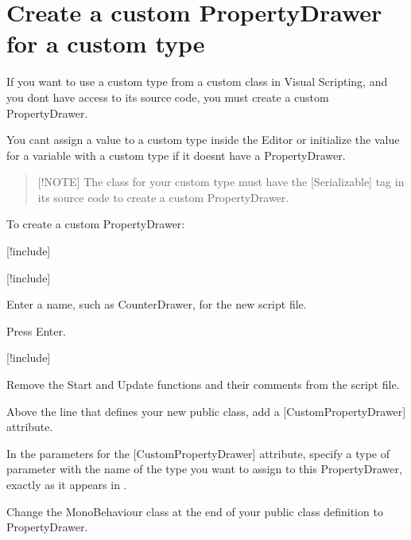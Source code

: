 \chapter{Create a custom Property\+Drawer for a custom type}
\hypertarget{md__library_2_package_cache_2com_8unity_8visualscripting_0d1_89_82_2_documentation_0i_2vs-create-custom-drawer}{}\label{md__library_2_package_cache_2com_8unity_8visualscripting_0d1_89_82_2_documentation_0i_2vs-create-custom-drawer}
\label{md__library_2_package_cache_2com_8unity_8visualscripting_0d1_89_82_2_documentation_0i_2vs-create-custom-drawer_autotoc_md1740}%
%
 If you want to use a custom type from a custom class in Visual Scripting, and you don\textquotesingle{}t have access to its source code, you must create a custom Property\+Drawer.

You can\textquotesingle{}t assign a value to a custom type inside the Editor or initialize the value for a variable with a custom type if it doesn\textquotesingle{}t have a Property\+Drawer.

\begin{quote}
\mbox{[}!\+NOTE\mbox{]} The class for your custom type must have the {\ttfamily \mbox{[}Serializable\mbox{]}} tag in its source code to create a custom Property\+Drawer. \end{quote}
To create a custom Property\+Drawer\+:


\begin{DoxyEnumerate}
\item \mbox{[}!include\mbox{]}
\item \mbox{[}!include\mbox{]}
\item Enter a name, such as {\ttfamily Counter\+Drawer}, for the new script file.
\item Press Enter.
\item \mbox{[}!include\mbox{]}
\item Remove the {\ttfamily Start} and {\ttfamily Update} functions and their comments from the script file.
\item Above the line that defines your new {\ttfamily public class}, add a {\ttfamily \mbox{[}Custom\+Property\+Drawer\mbox{]}} attribute.
\item In the parameters for the {\ttfamily \mbox{[}Custom\+Property\+Drawer\mbox{]}} attribute, specify a {\ttfamily type of} parameter with the name of the type you want to assign to this Property\+Drawer, exactly as it appears in .
\item Change the {\ttfamily Mono\+Behaviour} class at the end of your {\ttfamily public class} definition to {\ttfamily Property\+Drawer}.
\end{DoxyEnumerate}

